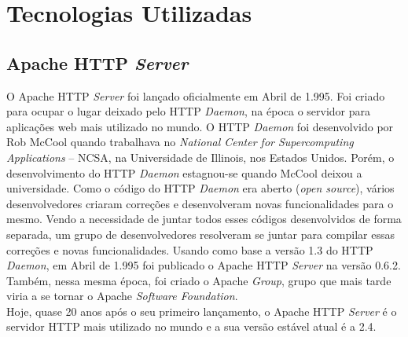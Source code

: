 \chapter{Tecnologias Utilizadas}\label{cap:tecnologias_utilizadas}
\section{Apache HTTP \textit{Server}}
O Apache HTTP \textit{Server} foi lançado oficialmente em Abril de 1.995. Foi 
criado para ocupar o lugar deixado pelo HTTP \textit{Daemon}, na época o 
servidor para aplicações web mais utilizado no mundo. O HTTP \textit{Daemon} 
foi desenvolvido por Rob McCool quando trabalhava no \textit{National Center 
for Supercomputing Applications} – NCSA, na Universidade de Illinois, nos 
Estados Unidos. Porém, o desenvolvimento do HTTP \textit{Daemon} estagnou-se 
quando McCool deixou a universidade. Como o código do HTTP \textit{Daemon} era 
aberto (\textit{open source}), vários desenvolvedores criaram correções e 
desenvolveram novas funcionalidades para o mesmo. Vendo a necessidade de juntar 
todos esses códigos desenvolvidos de forma separada, um grupo de 
desenvolvedores resolveram se juntar para compilar essas correções e novas 
funcionalidades. Usando como base a versão 1.3 do HTTP \textit{Daemon}, em 
Abril de 1.995 foi publicado o Apache HTTP \textit{Server} na versão 0.6.2. 
Também, nessa mesma época, foi criado o Apache \textit{Group}, grupo que mais 
tarde viria a se tornar o Apache \textit{Software Foundation}.\\
Hoje, quase 20 anos após o seu primeiro lançamento, o Apache HTTP \textit{Server} é o servidor HTTP mais utilizado no mundo e a sua versão estável atual é a 2.4.\\
